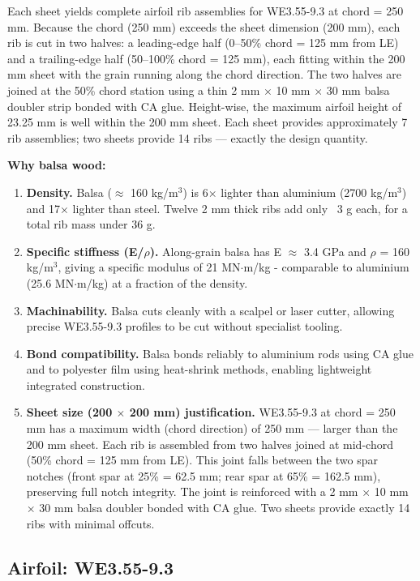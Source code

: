 \documentclass[10pt,a4paper]{article}
\begin{document}
Each sheet yields complete airfoil rib assemblies for WE3.55-9.3 at chord = 250 mm. Because the chord (250 mm) exceeds the sheet dimension (200 mm), each rib is cut in two halves: a leading-edge half (0--50\% chord = 125 mm from LE) and a trailing-edge half (50--100\% chord = 125 mm), each fitting within the 200 mm sheet with the grain running along the chord direction. The two halves are joined at the 50\% chord station using a thin 2 mm ${\times}$ 10 mm ${\times}$ 30 mm balsa doubler strip bonded with CA glue. Height-wise, the maximum airfoil height of 23.25 mm is well within the 200 mm sheet. Each sheet provides approximately 7 rib assemblies; two sheets provide 14 ribs --- exactly the design quantity.

\textbf{Why balsa wood:}

\begin{enumerate}[noitemsep,topsep=2pt]
\item \textbf{Density.} Balsa (${\approx}$ 160 kg/m$^{3}$) is 6${\times}$ lighter than aluminium (2700 kg/m$^{3}$) and 17${\times}$ lighter than steel. Twelve 2 mm thick ribs add only ~3 g each, for a total rib mass under 36 g.
\item \textbf{Specific stiffness (E/${\rho}$).} Along-grain balsa has E ${\approx}$ 3.4 GPa and ${\rho}$ = 160 kg/m$^{3}$, giving a specific modulus of 21 MN${\cdot}$m/kg - comparable to aluminium (25.6 MN${\cdot}$m/kg) at a fraction of the density.
\item \textbf{Machinability.} Balsa cuts cleanly with a scalpel or laser cutter, allowing precise WE3.55-9.3 profiles to be cut without specialist tooling.
\item \textbf{Bond compatibility.} Balsa bonds reliably to aluminium rods using CA glue and to polyester film using heat-shrink methods, enabling lightweight integrated construction.
\item \textbf{Sheet size (200 ${\times}$ 200 mm) justification.} WE3.55-9.3 at chord = 250 mm has a maximum width (chord direction) of 250 mm --- larger than the 200 mm sheet. Each rib is assembled from two halves joined at mid-chord (50\% chord = 125 mm from LE). This joint falls between the two spar notches (front spar at 25\% = 62.5 mm; rear spar at 65\% = 162.5 mm), preserving full notch integrity. The joint is reinforced with a 2 mm ${\times}$ 10 mm ${\times}$ 30 mm balsa doubler bonded with CA glue. Two sheets provide exactly 14 ribs with minimal offcuts.
\end{enumerate}

\subsection{Airfoil: WE3.55-9.3}
\end{document}
